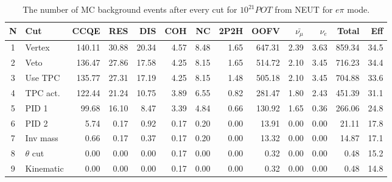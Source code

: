 \documentclass[../main.tex]{subfiles}
\begin{document}
\begin{table}[!ht]
\begin{tabular}{|c|l|r|r|r|r|r|r|r|r|r|r|r|}
  \hline
  N & Cut           &  CCQE   &  RES  &  DIS  &  COH  &  NC  &  2P2H  &  OOFV  &$\bar{\nu_{\mu}}$& $\nu_{e}$ & Total  & Eff\\
  \hline
  1 & Vertex        & 140.11  & 30.88 & 20.34 & 4.57  & 8.48 & 1.65   & 647.31 & 2.39            &  3.63     & 859.34 & 34.5 \\
  \hline
  2 & Veto          & 136.47  & 27.86 & 17.58 & 4.25  & 8.15 & 1.65   & 514.72 & 2.10            &  3.45     & 716.23 & 34.4 \\
  \hline
  3 & Use TPC       & 135.77  & 27.31 & 17.19 & 4.25  & 8.15 & 1.48   & 505.18 & 2.10            &  3.45     & 704.88 & 33.6 \\
  \hline
  4 & TPC act.      & 122.44  & 21.24 & 10.75 & 3.89  & 6.55 & 0.82   & 281.47 & 1.80            &  2.43     & 451.39 & 31.1 \\
  \hline
  5 & PID 1         & 99.68   & 16.10 & 8.47  & 3.39  & 4.84 & 0.66   & 130.92 & 1.65            &  0.36     & 266.06 & 24.8 \\
  \hline
  6 & PID 2         & 5.74    & 0.17  & 0.92  & 0.17  & 0.20 & 0.00   & 13.91  & 0.00            &  0.00     &  21.11 & 17.8 \\
  \hline
  7 & Inv mass      & 0.66    & 0.17  & 0.37  & 0.17  & 0.20 & 0.00   & 13.32  & 0.00            &  0.00     &  14.87 & 17.1  \\
  \hline
  8 & $\theta$ cut  & 0.00    & 0.00  & 0.00  & 0.17  & 0.00 & 0.00   & 0.32   & 0.00            &  0.00     &  0.48  & 15.2 \\
  \hline
  9 & Kinematic     & 0.00    & 0.00  & 0.00  & 0.17  & 0.00 & 0.00   & 0.32   & 0.00            &  0.00     &  0.48  & 14.8 \\
    \hline

\end{tabular}
\caption{The number of MC background events after every cut for $10^{21} POT$ from NEUT for $e\pi$ mode.}
\label{tbl:HNL:bgOrigEle}
\end{table}
\end{document}
